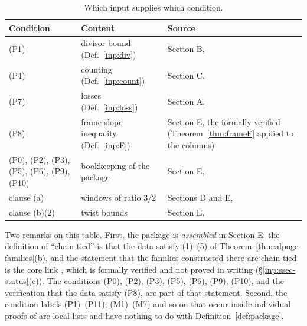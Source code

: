 \documentclass[10pt]{amsart}
\theoremstyle{definition}
\theoremstyle{remark}
\begin{document}
\begin{table}[ht]
\caption{Which input supplies which condition.}\label{inp:tab-conditions}
\small
\begin{tabular}{p{}p{}p{}}
\toprule
Condition & Content & Source\\
\midrule
(P1) & divisor bound (Def.~\ref{inp:div}) & Section B, \cite[Proposition~\ref{A-i2:prop-P1}]{Annex}\\
(P4) & counting (Def.~\ref{inp:count}) & Section C, \cite[Theorem~\ref{A-i3:thm-main}(d)]{Annex}\\
(P7) & losses (Def.~\ref{inp:loss}) & Section A, \cite[Theorem~\ref{A-i1:thm-loss}]{Annex}\\
(P8) & frame slope inequality (Def.~\ref{inp:F}) & Section E, the formally verified \cite[Proposition~\ref{A-i4:Lprop-fam}(b)]{Annex} (Theorem~\ref{thm:frameF} applied to the columns)\\
(P0), (P2), (P3), (P5), (P6), (P9), (P10) & bookkeeping of the package & Section E, \cite[Proposition~\ref{A-i4:Lprop-fam}(c)]{Annex}\\
clause (a) & windows of ratio $3/2$ & Sections D and E, \cite[Proposition~\ref{A-i4:prop-supply}]{Annex}\\
clause (b)(2) & twist bounds & Section E, \cite[Proposition~\ref{A-i4:Sprop-tw}]{Annex}\\
\bottomrule
\end{tabular}
\end{table}

Two remarks on this table. First, the package is \emph{assembled} in
Section E: the definition of ``chain-tied''
\cite[Definition~\ref{A-i4:def-chain}]{Annex} is that the data satisfy
(1)--(5) of Theorem~\ref{thm:alpoge-families}(b), and the statement that
the families constructed there are chain-tied is the core link
\cite[Proposition~\ref{A-i4:Lprop-fam}(c)]{Annex}, which is formally verified
and not proved in writing (\S\ref{inp:ssec-status}(c)). The conditions
(P0), (P2), (P3), (P5), (P6), (P9), (P10), and the verification that the
data satisfy (P8), are part of that statement. Second, the condition
labels (P1)--(P11), (M1)--(M7) and so on that occur inside individual
proofs of \cite{Annex} are local lists and have nothing to do with
Definition~\ref{def:package}.
\end{document}
